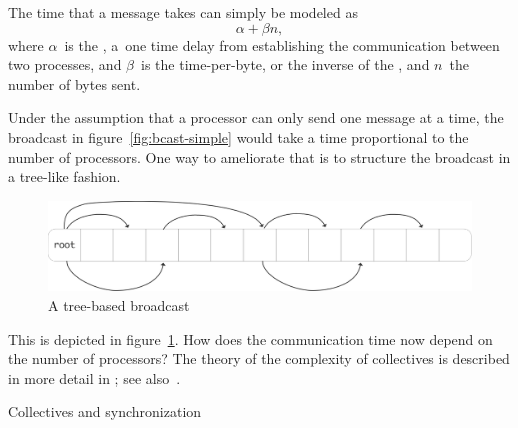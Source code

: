 The time that a message takes can simply be modeled as
\[ \alpha +\beta n, \]
where $\alpha$~is the , a~one time
delay from establishing the communication between two processes,
and $\beta$~is the time-per-byte, or the inverse of the ,
and $n$~the number of bytes sent.

Under the assumption that
a processor can only send one message at a time,
the broadcast in
figure~\ref{fig:bcast-simple} would take a time proportional to the
number of processors. One way to ameliorate that is to structure the
broadcast in a tree-like fashion.
\begin{figure}[ht]
  \includegraphics[scale=.1]{graphics/bcast-tree}
  \caption{A tree-based broadcast}
  \label{fig:bcast-tree}
\end{figure}
This is depicted in figure~\ref{fig:bcast-tree}. How does the
communication time now depend on the number of processors? The theory
of the complexity of collectives is described in more detail in
; see also~\cite{Chan2007Collective}.

 {Collectives and synchronization}

